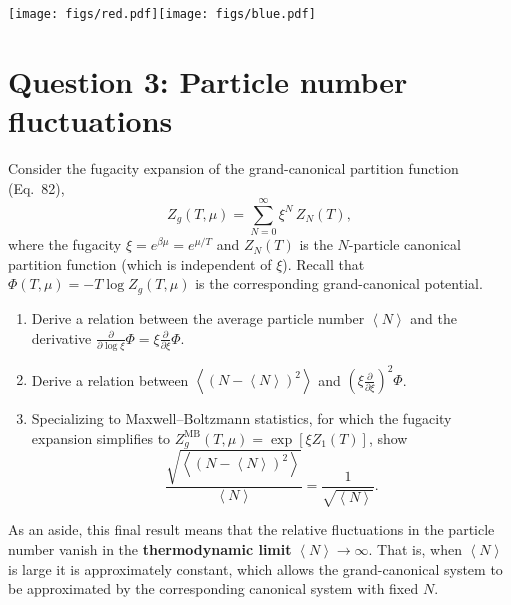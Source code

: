 \documentclass[12 pt]{article} %
\newcommand{\be}{\ensuremath{\beta} }
\newcommand{\vev}[1]{\ensuremath{\left\langle #1 \right\rangle} }
\newcommand{\pderiv}[2]{\ensuremath{\frac{\partial #1}{\partial #2}} }
\newcommand{\showmarks}[1]{\rightline{\texttt{[#1 marks]}}} %
\begin{document}
\begin{center}\texttt{[image: figs/red.pdf]}\hspace{0.3\textwidth}\texttt{[image: figs/blue.pdf]}\end{center}



\newpage
\section*{Question 3: Particle number fluctuations}
Consider the fugacity expansion of the grand-canonical partition function (Eq.~82),
\begin{equation*}
  Z_g(T, \mu) = \sum_{N = 0}^{\infty} \xi^N \, Z_N(T),
\end{equation*}
where the fugacity $\xi = e^{\be \mu} = e^{\mu / T}$ and $Z_N(T)$ is the $N$-particle canonical partition function (which is independent of $\xi$).
Recall that $\Phi(T, \mu) = -T \log Z_g(T, \mu)$ is the corresponding grand-canonical potential.

\begin{enumerate}[label={(\alph*)}]
  \item Derive a relation between the average particle number $\vev{N}$ and the derivative $\displaystyle \pderiv{}{\log \xi}\Phi = \xi \pderiv{}{\xi}\Phi$.

  \showmarks{4}

\item Derive a relation between $\vev{\left(N - \vev{N}\right)^2}$ and $\displaystyle \left(\xi \pderiv{}{\xi}\right)^2 \Phi$.

  \showmarks{4}

  \item Specializing to Maxwell--Boltzmann statistics, for which the fugacity expansion simplifies to $Z_g^{\text{MB}}(T, \mu) = \exp[\xi Z_1(T)]$, show
        \begin{equation*}
          \frac{\sqrt{\vev{\left(N - \vev{N}\right)^2}}}{\vev{N}} = \frac{1}{\sqrt{\vev{N}}}.
        \end{equation*}

  \showmarks{4}
\end{enumerate}

As an aside, this final result means that the relative fluctuations in the particle number vanish in the \textbf{thermodynamic limit} $\vev{N} \to \infty$.
That is, when $\vev{N}$ is large it is approximately constant, which allows the grand-canonical system to be approximated by the corresponding canonical system with fixed $N$.
\end{document}
